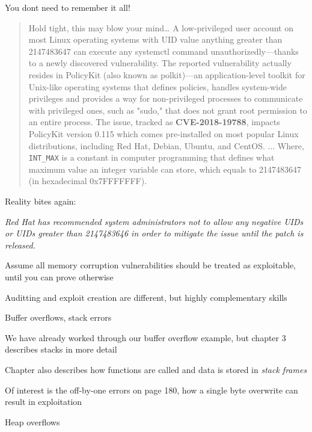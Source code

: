 \documentclass[Screen16to9,17pt]{foils}
\begin{document}
\centerline{You dont need to remember it all!}



\begin{quote}
Hold tight, this may blow your mind…
A low-privileged user account on most Linux operating systems with UID value anything greater than 2147483647 can execute any systemctl command unauthorizedly—thanks to a newly discovered vulnerability.
The reported vulnerability actually resides in PolicyKit (also known as polkit)—an application-level toolkit for Unix-like operating systems that defines policies, handles system-wide privileges and provides a way for non-privileged processes to communicate with privileged ones, such as "sudo," that does not grant root permission to an entire process.
The issue, tracked as {\bf CVE-2018-19788}, impacts PolicyKit version 0.115 which comes pre-installed on most popular Linux distributions, including Red Hat, Debian, Ubuntu, and CentOS.
...
Where, \verb+INT_MAX+ is a constant in computer programming that defines what maximum value an integer variable can store, which equals to 2147483647 (in hexadecimal 0x7FFFFFFF).
\end{quote}

\begin{list2}
\item Reality bites again:\\
\item \emph{Red Hat has recommended system administrators not to allow any negative UIDs or UIDs greater than 2147483646 in order to mitigate the issue until the patch is released.}
\end{list2}





\begin{list2}
\item Assume all memory corruption vulnerabilities should be treated as exploitable, until you can prove otherwise
\item Auditting and exploit creation are different, but highly complementary skills
\end{list2}


\begin{list2}
\item Buffer overflows, stack errors
\item We have already worked through our buffer overflow example, but chapter 3 describes stacks in more detail
\item Chapter also describes how functions are called and data is stored in \emph{stack frames}
\item Of interest is the off-by-one errors on page 180, how a single byte overwrite can result in exploitation
\item Heap overflows
\end{list2}
\end{document}
